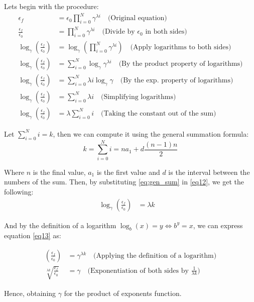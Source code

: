 \noindent Lets begin with the procedure:
\begin{align}
	\epsilon_f &= \epsilon_0 \prod_{i=0}^{N} \gamma^{\lambda i} \quad \text{(Original equation)} \label{eq4} \\
	\frac{\epsilon_f}{\epsilon_0} &= \prod_{i=0}^{N} \gamma^{\lambda i} \quad \text{(Divide by $\epsilon_0$ in both sides)} \label{eq6} \\
	\log_\gamma \left(\frac{\epsilon_f}{\epsilon_0}\right) &= \log_\gamma \left( \prod_{i=0}^{N} \gamma^{\lambda i} \right) \quad \text{(Apply logarithms to both sides)} \label{eq7} \\
	\log_\gamma \left(\frac{\epsilon_f}{\epsilon_0}\right) &= \sum_{i=0}^{N} \log_\gamma  \gamma^{\lambda i} \quad \text{(By the product property of logarithms)} \label{eq9} \\
	\log_\gamma \left(\frac{\epsilon_f}{\epsilon_0}\right) &= \sum_{i=0}^{N} \lambda i \log_\gamma \gamma \quad \text{(By the exp. property of logarithms)} \label{eq10} \\
	\log_\gamma \left(\frac{\epsilon_f}{\epsilon_0}\right) &= \sum_{i=0}^{N} \lambda i \quad \text{(Simplifying logarithms)} \label{eq11} \\
	\log_\gamma \left(\frac{\epsilon_f}{\epsilon_0}\right) &= \lambda \sum_{i=0}^{N} i \quad \text{(Taking the constant out of the sum)} \label{eq12} 
\end{align}

Let $\sum_{i=0}^{N} i = k$, then we can compute it using the general summation formula:
\begin{equation}
	\label{eq:gen_sum}
	k = \sum_{i=0}^{N} i  = n a_1 + d \frac{(n-1)n}{2}
\end{equation}

Where $n$ is the final value, $a_1$ is the first value and $d$ is the interval between the numbers of the sum. Then, by substituting \ref{eq:gen_sum} in \ref{eq12}, we get the following:
\begin{align}
	\log_\gamma \left(\frac{\epsilon_f}{\epsilon_0}\right) &= \lambda k \quad \label{eq13}
\end{align}

And by the definition of a logarithm $\log_b(x) = y \Leftrightarrow b^y = x$, we can express equation \ref{eq13} as:

\begin{align}
	\left(\frac{\epsilon_f}{\epsilon_0}\right) &= \gamma^{\lambda k} \quad \text{(Applying the definition of a logarithm)} \label{eq14} \\
	\sqrt[\lambda k]{\frac{\epsilon_f}{\epsilon_0}} &=\gamma \quad \text{(Exponentiation of both sides by $\frac{1}{\lambda k}$)} \label{eq15}
\end{align}

Hence, obtaining $\gamma$ for the product of exponents function.
